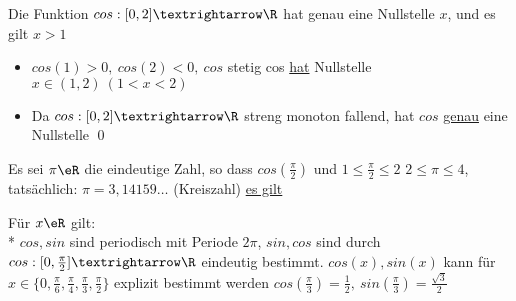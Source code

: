 Die Funktion $cos:[0,2]→\R$ hat genau eine Nullstelle $x$, und es gilt $x>1$
\bew
\begin{itemize}
\item{$cos(1)>0,\ cos(2)<0,\ cos$ stetig  cos \ul{hat} Nullstelle $x\in(1,2)\ (1<x<2)$}
\item{Da $cos:[0,2]→\R$ streng monoton fallend, hat $cos$ \ul{genau} eine Nullstelle \qed}
\end{itemize}

Es sei $\pi\eR$ die eindeutige Zahl, so dass $cos(\frac{\pi}{2})$ und $1\leq\frac{\pi}{2}\leq 2$
\bem
$2\leq \pi \leq 4$, tatsächlich: $\pi=3,14159…$ (Kreiszahl)
\ul{es gilt}

Für $x\eR$ gilt:\\*
\bem
$cos,sin$ sind periodisch mit Periode $2\pi$, $sin,cos$ sind durch $cos:[0,\frac{\pi}{2}]→\R$ eindeutig bestimmt.
\bem
$cos(x),sin(x)$ kann für $x\in \{0,\frac{\pi}{6},\frac{\pi}{4},\frac{\pi}{3},\frac{\pi}{2}\}$ explizit bestimmt werden
\bsp
$cos(\frac{\pi}{3})=\frac{1}{2},\ sin(\frac{\pi}{3})=\frac{\sqrt{3}}{2}$
